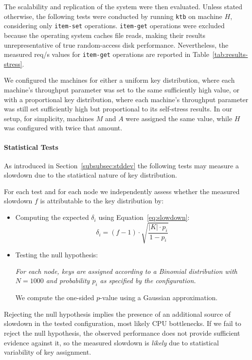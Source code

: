 The scalability and replication of the system were then evaluated.
Unless stated otherwise, the following tests were conducted by running \texttt{ktb} on machine $H$, considering only \texttt{item-set} operations.
\texttt{item-get} operations were excluded because the operating system caches file reads, making their results unrepresentative of true random-access disk performance.
Nevertheless, the measured req/s values for \texttt{item-get} operations are reported in Table~\ref{tab:results-stress}.

We configured the machines for either a uniform key distribution, where each machine's throughput parameter was set to the same sufficiently high value,
or with a proportional key distribution, where each machine's throughput parameter was still set sufficiently high but proportional to its self-stress results.
In our setup, for simplicity, machines $M$ and $A$ were assigned the same value, while $H$ was configured with twice that amount.

\paragraph{Statistical Tests}
As introduced in Section~\ref{subsubsec:stddev} the following tests
may measure a slowdown due to the statistical nature of key distribution.

For each test and for each node we independently assess whether the measured slowdown $f$ is attributable to the key distribution by:
\begin{itemize}
    \item Computing the expected $\delta_i$ using Equation~\ref{eq:slowdown}:
    \[
        \delta_i = (f - 1) \cdot \sqrt{\frac{|K| \cdot p_i}{1 - p_i}}
    \]
    \item Testing the null hypothesis:
    \begin{center}
        \textit{For each node, keys are assigned according to a Binomial distribution with $N=1000$ and probability $p_i$ as specified by the configuration.}
    \end{center}
    We compute the one-sided $p$-value using a Gaussian approximation.
\end{itemize}

Rejecting the null hypothesis implies the presence of an additional source of slowdown
in the tested configuration, most likely CPU bottlenecks.
If we fail to reject the null hypothesis,
the observed performance does not provide sufficient evidence against it,
so the measured slowdown is \textit{likely} due to statistical variability of key assignment.

